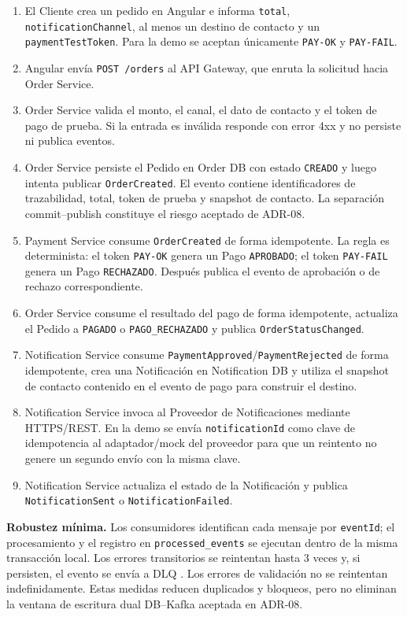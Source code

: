 \documentclass[12pt,a4paper]{article}
\begin{document}
\begin{enumerate}[leftmargin=*,label=\arabic*.]
    \item El Cliente crea un pedido en Angular e informa \texttt{total}, \texttt{notificationChannel}, al menos un destino de contacto y un \texttt{payment\-Test\-Token}. Para la demo se aceptan únicamente \texttt{PAY-OK} y \texttt{PAY-FAIL}.
    \item Angular envía \texttt{POST /orders} al API Gateway, que enruta la solicitud hacia Order Service.
    \item Order Service valida el monto, el canal, el dato de contacto y el token de pago de prueba. Si la entrada es inválida responde con error 4xx y no persiste ni publica eventos.
    \item Order Service persiste el Pedido en Order DB con estado \texttt{CREADO} y luego intenta publicar \texttt{OrderCreated}. El evento contiene identificadores de trazabilidad, total, token de prueba y snapshot de contacto. La separación commit--publish constituye el riesgo aceptado de ADR-08.
    \item Payment Service consume \texttt{OrderCreated} de forma idempotente. La regla es determinista: el token \texttt{PAY-OK} genera un Pago \texttt{APROBADO}; el token \texttt{PAY-FAIL} genera un Pago \texttt{RECHAZADO}. Después publica el evento de aprobación o de rechazo correspondiente.
    \item Order Service consume el resultado del pago de forma idempotente, actualiza el Pedido a \texttt{PAGADO} o \texttt{PAGO\_RECHAZADO} y publica \texttt{OrderStatusChanged}.
    \item Notification Service consume \texttt{PaymentApproved}/\texttt{PaymentRejected} de forma idempotente, crea una Notificación en Notification DB y utiliza el snapshot de contacto contenido en el evento de pago para construir el destino.
    \item Notification Service invoca al Proveedor de Notificaciones mediante HTTPS/REST. En la demo se envía \texttt{notificationId} como clave de idempotencia al adaptador/mock del proveedor para que un reintento no genere un segundo envío con la misma clave.
    \item Notification Service actualiza el estado de la Notificación y publica \texttt{NotificationSent} o \texttt{NotificationFailed}.
\end{enumerate}

\textbf{Robustez mínima.} Los consumidores identifican cada mensaje por \texttt{eventId}; el procesamiento y el registro en \texttt{processed\_events} se ejecutan dentro de la misma transacción local. Los errores transitorios se reintentan hasta 3 veces y, si persisten, el evento se envía a DLQ \cite{spring-kafka-retry}. Los errores de validación no se reintentan indefinidamente. Estas medidas reducen duplicados y bloqueos, pero no eliminan la ventana de escritura dual DB--Kafka aceptada en ADR-08.
\end{document}
